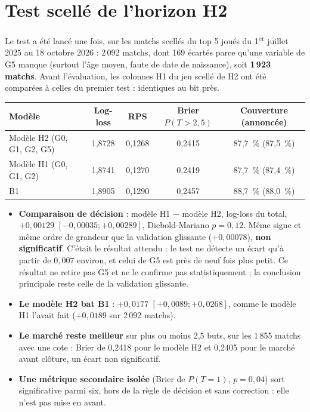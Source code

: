 \section{Test scellé de l'horizon H2}
\label{sec:resultats-test-h2}

Le test a été lancé une fois, sur les matchs scellés du top 5 joués du 1\textsuperscript{er} juillet 2025 au
18 octobre 2026 : 2\,092 matchs, dont 169 écartés parce qu'une variable de G5 manque (surtout l'âge moyen,
faute de date de naissance), soit \textbf{1\,923 matchs}. Avant l'évaluation, les colonnes H1 du jeu scellé de
H2 ont été comparées à celles du premier test : identiques au bit près.

\begin{center}
\begin{tabular}{lcccc}
\toprule
Modèle & Log-loss & RPS & Brier \(P(T > 2{,}5)\) & Couverture (annoncée) \\
\midrule
Modèle H2 (G0, G1, G2, G5) & 1,8728 & 0,1268 & 0,2415 & 87,7~\% (87,5~\%) \\
Modèle H1 (G0, G1, G2) & 1,8741 & 0,1270 & 0,2419 & 87,7~\% (87,4~\%) \\
B1 & 1,8905 & 0,1290 & 0,2457 & 88,7~\% (88,0~\%) \\
\bottomrule
\end{tabular}
\end{center}

\begin{itemize}
  \item \textbf{Comparaison de décision} : modèle H1 \(-\) modèle H2, log-loss du total,
        \(+0{,}00129\) \([-0{,}00035 ; +0{,}00289]\), Diebold-Mariano \(p = 0{,}12\). Même signe et même
        ordre de grandeur que la validation glissante (\(+0{,}00078\)), \textbf{non significatif}. C'était le
        résultat attendu : le test ne détecte un écart qu'à partir de \(0{,}007\) environ, et celui de G5 est
        près de neuf fois plus petit. Ce résultat ne retire pas G5 et ne le confirme pas statistiquement ; la
        conclusion principale reste celle de la validation glissante.
  \item \textbf{Le modèle H2 bat B1} : \(+0{,}0177\) \([+0{,}0089 ; +0{,}0268]\), comme le modèle H1 l'avait
        fait (\(+0{,}0189\) sur 2\,092 matchs).
  \item \textbf{Le marché reste meilleur} sur plus ou moins 2,5 buts, sur les 1\,855 matchs avec une cote :
        Brier de 0,2418 pour le modèle H2 et 0,2405 pour le marché avant clôture, un écart non significatif.
  \item \textbf{Une métrique secondaire isolée} (Brier de \(P(T = 1)\), \(p = 0{,}04\)) sort significative parmi
        six, hors de la règle de décision et sans correction : elle n'est pas mise en avant.
\end{itemize}

